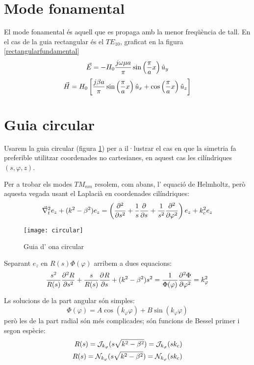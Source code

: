\section{Mode fonamental}

El mode fonamental és aquell que es propaga amb la menor freqüència de tall. En el cas de la guia rectangular és el $TE_{10}$, graficat en la figura \cref{rectangularfundamental}
\begin{equation}
  \vec E = - H_0 \frac{\jmath \omega \mu a}{\pi} \sin \left ( \frac{\pi}{a} x \right) \uy
\end{equation}
\begin{equation}
  \vec H =  H_0 \left[\frac{\jmath \beta a}{\pi} \sin \left ( \frac{\pi}{a} x \right) \ux + \cos \left ( \frac{\pi}{a} x \right ) \uz \right]
\end{equation}

\section{Guia circular}

Usarem la guia circular (figura \cref{circular}) per a il·lustrar el cas en que la simetria fa preferible utilitzar coordenades no cartesianes, en aquest cas les cilíndriques $(s, \varphi, z)$.

Per a trobar els modes $TM_{nm}$ resolem, com abans, l' equació de Helmholtz, però aquesta vegada usant el Laplacià en coordenades cilíndriques:
\begin{equation}
  \del _t ^ 2 e_z + (k^ 2 - \beta ^2 ) e_z = \left ( \pd[2]{}{s} + \frac{1}{s}\pd{}{s} + \frac{1}{s^2} \pd[2]{}{\varphi}  \right )  e_z + k_c ^2 e_z
\end{equation}

\begin{figure}[ht]
  \centering
  \texttt{[image: circular]}
  \caption{Guia d' ona circular}
  \label{circular}
  \vspace{-1 em}
\end{figure}

Separant $e_z$ en $R(s)\Phi(\varphi)$ arribem a dues equacions:
\begin{equation}
  \frac{s^2}{R(s)} \pd[2]{R}{s} + \frac{s}{R(s)} \pd{R}{s} + (k^2 - \beta ^2) s^2  =
  \frac{1}{\Phi(\varphi)} \pd[2]{\Phi}{\varphi} =
  k_{\varphi} ^2
\end{equation}

Ls solucions de la part angular són simples:
\begin{equation}
  \label{solangular}
  \Phi (\varphi) = A \cos(k _{\varphi} \varphi ) + B \sin (k_{\varphi} \varphi)
\end{equation}
però les de la part radial són més complicades; són funcions de Bessel primer i segon espècie:
\begin{subequations}
  \begin{align}
    R(s) = \Bf _{k_\varphi} (s\sqrt{k^2 - \beta ^2})  =  \Bf _{k_\varphi} (s k_c)  \nonumber \\
    R(s) = \Bs _{k_\varphi} (s\sqrt{k^2 - \beta ^2})  =  \Bs _{k_\varphi} (s k_c)  \nonumber
  \end{align}
\end{subequations}

